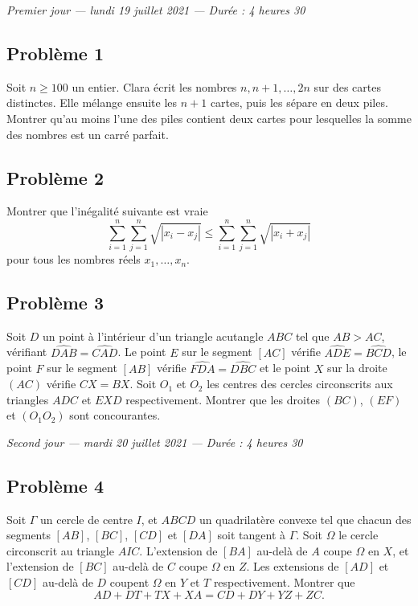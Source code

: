 
\begin{center}
  \emph{Premier jour --- lundi 19 juillet 2021 --- Durée : 4 heures 30}
\end{center}

\subsection*{Problème 1}
Soit $n \geqslant 100$ un entier. Clara écrit les nombres $n, n+1, \ldots, 2n$ sur des cartes
distinctes. Elle mélange ensuite les $n+1$ cartes, puis les sépare en deux piles. Montrer qu'au moins
l'une des piles contient deux cartes pour lesquelles la somme des nombres est un carré parfait.

\subsection*{Problème 2}
Montrer que l'inégalité suivante est vraie
\[
\sum_{i=1}^{n} \sum_{j=1}^{n} \sqrt{|x_i - x_j|} \leqslant \sum_{i=1}^{n} \sum_{j=1}^{n} \sqrt{|x_i + x_j|}
\]
pour tous les nombres réels $x_1, \ldots, x_n$.

\subsection*{Problème 3}
Soit $D$ un point à l'intérieur d'un triangle acutangle $ABC$ tel que $AB > AC$, vérifiant
$\widehat{DAB} = \widehat{CAD}$. Le point $E$ sur le segment $[AC]$ vérifie $\widehat{ADE} = \widehat{BCD}$, le point $F$
sur le segment $[AB]$ vérifie $\widehat{FDA} = \widehat{DBC}$ et le point $X$ sur la droite $(AC)$ vérifie $CX = BX$.
Soit $O_1$ et $O_2$ les centres des cercles circonscrits aux triangles $ADC$ et $EXD$ respectivement.
Montrer que les droites $(BC)$, $(EF)$ et $(O_1O_2)$ sont concourantes.

\bigskip
\begin{center}
  \emph{Second jour --- mardi 20 juillet 2021 --- Durée : 4 heures 30}
\end{center}

\subsection*{Problème 4}
Soit $\Gamma$ un cercle de centre $I$, et $ABCD$ un quadrilatère convexe tel que chacun des segments
$[AB]$, $[BC]$, $[CD]$ et $[DA]$ soit tangent à $\Gamma$. Soit $\Omega$ le cercle circonscrit au triangle $AIC$.
L'extension de $[BA]$ au-delà de $A$ coupe $\Omega$ en $X$, et l'extension de $[BC]$ au-delà de $C$ coupe $\Omega$ en $Z$.
Les extensions de $[AD]$ et $[CD]$ au-delà de $D$ coupent $\Omega$ en $Y$ et $T$ respectivement. Montrer que
\[
AD + DT + TX + XA = CD + DY + YZ + ZC.
\]

